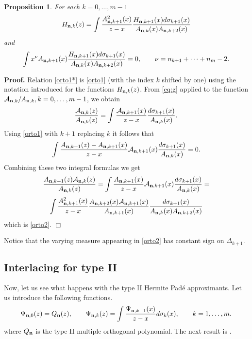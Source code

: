 \documentclass{amsart}
\newtheorem{pro}{\sc Proposition}[section]
\theoremstyle{definition}
\theoremstyle{remark}
\begin{document}
\begin{pro} \label{teo:5} For each $k=0,\ldots,m-1$
\begin{equation} \label{orto2}
H_{{\bf n},k}(z) = \int \frac{A_{{\bf n},k+1}^2(x)}{z-x}  \frac{H_{{\bf n},k+1}(x)d \sigma_{k+1} (x)}{A_{{\bf n},k}(x)A_{{\bf n},k+2}(x)}
\end{equation}
and
\begin{equation} \label{orto1*}
\int x^\nu A_{{\bf n},k+1}(x)  \frac{H_{{\bf n},k+1}(x)d \sigma_{k+1} (x)}{A_{{\bf n},k}(x)A_{{\bf n},k+2}(x)} = 0, \qquad \nu =  n_{k+1}+\cdots+n_m -2.
\end{equation}
\end{pro}

{\bf Proof.} Relation \eqref{orto1*} is \eqref{orto1} (with the index $k$ shifted by one) using the notation introduced for the functions $H_{{\bf n},k}(z)$. From \eqref{eq:g} applied to the function ${\mathcal{A}}_{{\bf n},k}/A_{{\bf n},k}, k=0,\ldots,m-1$, we obtain
\[ \frac{{\mathcal{A}}_{{\bf n},k}(z)}{A_{{\bf n},k}(z)} = \int \frac{{\mathcal{A}}_{{\bf n},k+1}(x)}{z-x} \frac{d\sigma_{k+1}(x)}{A_{{\bf n},k}(x)}.
\]
Using \eqref{orto1} with $k+1$ replacing $k$ it follows that
\[ \int \frac{A_{{\bf n},k+1}(z) - A_{{\bf n},k+1}(x)}{z-x} {\mathcal{A}}_{{\bf n},k+1}(x) \frac{d \sigma_{k+1} (x)}{A_{{\bf n},k}(x)} = 0.
\]
Combining these two integral formulas we get
\[ \frac{A_{{\bf n},k+1}(z){\mathcal{A}}_{{\bf n},k}(z)}{A_{{\bf n},k}(z)} = \int \frac{A_{{\bf n},k+1}(x)}{z-x} {\mathcal{A}}_{{\bf n},k+1}(x) \frac{d \sigma_{k+1} (x)}{A_{{\bf n},k}(x)} =
\]
\[\int \frac{A_{{\bf n},k+1}^2(x)}{z-x} \frac{A_{{\bf n},k+2}(x){\mathcal{A}}_{{\bf n},k+1}(x)}{A_{{\bf n},k+1}(x)} \frac{d \sigma_{k+1} (x)}{A_{{\bf n},k}(x)A_{{\bf n},k+2}(x)}
\]
which is \eqref{orto2}. \hfill $\Box$

\medskip

Notice that the varying measure appearing in \eqref{orto2} has constant sign on $\Delta_{k+1}$.

\medskip

\subsection{Interlacing for type II} Now, let us see what happens with the type II Hermite Pad\'e approximants. Let us introduce the following functions.
\[
\Psi_{{\bf n},0}(z)=Q_{{\bf n}}(z),\qquad\Psi_{{\bf n},k}(z)=\int
\frac{\Psi_{{\bf n},k-1}(x)}{z-x} d\sigma_k(x),\qquad k=1,\ldots,m.
\]
where $Q_{\bf n}$ is the type II multiple orthogonal polynomial. The next result is  \cite[Proposition 1]{GRS}.
\end{document}
